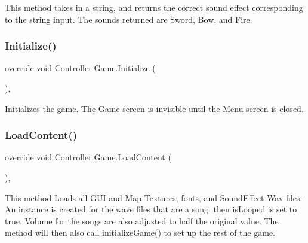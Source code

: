 This method takes in a string, and returns the correct sound effect corresponding to the string input. The sounds returned are Sword, Bow, and Fire. \hypertarget{class_controller_1_1_game_aa3a270df3da66d794d8607e029bf9608}{}\label{class_controller_1_1_game_aa3a270df3da66d794d8607e029bf9608} 
\subsubsection{\texorpdfstring{Initialize()}{Initialize()}}
{\footnotesize\ttfamily override void Controller.\+Game.\+Initialize (\begin{DoxyParamCaption}{ }\end{DoxyParamCaption})\hspace{0.3cm}{\ttfamily [inline]}, {\ttfamily [protected]}}

Initializes the game. The \hyperlink{class_controller_1_1_game}{Game} screen is invisible until the Menu screen is closed. \hypertarget{class_controller_1_1_game_a05c5bf033337a7f5130735e218772770}{}\label{class_controller_1_1_game_a05c5bf033337a7f5130735e218772770} 
\subsubsection{\texorpdfstring{Load\+Content()}{LoadContent()}}
{\footnotesize\ttfamily override void Controller.\+Game.\+Load\+Content (\begin{DoxyParamCaption}{ }\end{DoxyParamCaption})\hspace{0.3cm}{\ttfamily [inline]}, {\ttfamily [protected]}}

This method Loads all G\+UI and Map Textures, fonts, and Sound\+Effect Wav files. An instance is created for the wave files that are a song, then is\+Looped is set to true. Volume for the songs are also adjusted to half the original value. The method will then also call initialize\+Game() to set up the rest of the game. \hypertarget{class_controller_1_1_game_a57f4f23e2ca97a9ed820aab106a2ebe3}{}\label{class_controller_1_1_game_a57f4f23e2ca97a9ed820aab106a2ebe3} 
